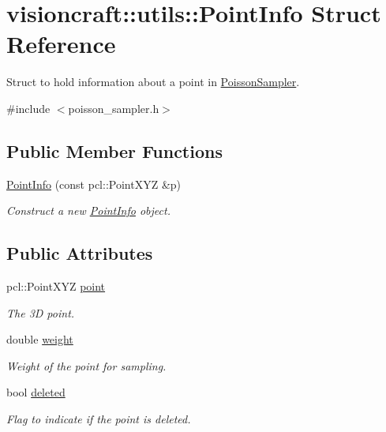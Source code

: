 \hypertarget{structvisioncraft_1_1utils_1_1PointInfo}{}\section{visioncraft\+:\+:utils\+:\+:Point\+Info Struct Reference}
\label{structvisioncraft_1_1utils_1_1PointInfo}


Struct to hold information about a point in \hyperlink{classvisioncraft_1_1utils_1_1PoissonSampler}{Poisson\+Sampler}.  




{\ttfamily \#include $<$poisson\+\_\+sampler.\+h$>$}

\subsection*{Public Member Functions}
\begin{DoxyCompactItemize}
\item 
\hyperlink{structvisioncraft_1_1utils_1_1PointInfo_a445d9bdd79b17e89a49a0006e2437306}{Point\+Info} (const pcl\+::\+Point\+X\+YZ \&p)
\begin{DoxyCompactList}\small\item\em Construct a new \hyperlink{structvisioncraft_1_1utils_1_1PointInfo}{Point\+Info} object. \end{DoxyCompactList}\end{DoxyCompactItemize}
\subsection*{Public Attributes}
\begin{DoxyCompactItemize}
\item 
pcl\+::\+Point\+X\+YZ \hyperlink{structvisioncraft_1_1utils_1_1PointInfo_a3f9d181ac262ed933fc486e765dce83d}{point}
\begin{DoxyCompactList}\small\item\em The 3D point. \end{DoxyCompactList}\item 
double \hyperlink{structvisioncraft_1_1utils_1_1PointInfo_aa33bc2994ddc137847329f059c93f032}{weight}
\begin{DoxyCompactList}\small\item\em Weight of the point for sampling. \end{DoxyCompactList}\item 
bool \hyperlink{structvisioncraft_1_1utils_1_1PointInfo_a2719827945e82a19a5a5de30495b85d3}{deleted}
\begin{DoxyCompactList}\small\item\em Flag to indicate if the point is deleted. \end{DoxyCompactList}\end{DoxyCompactItemize}


